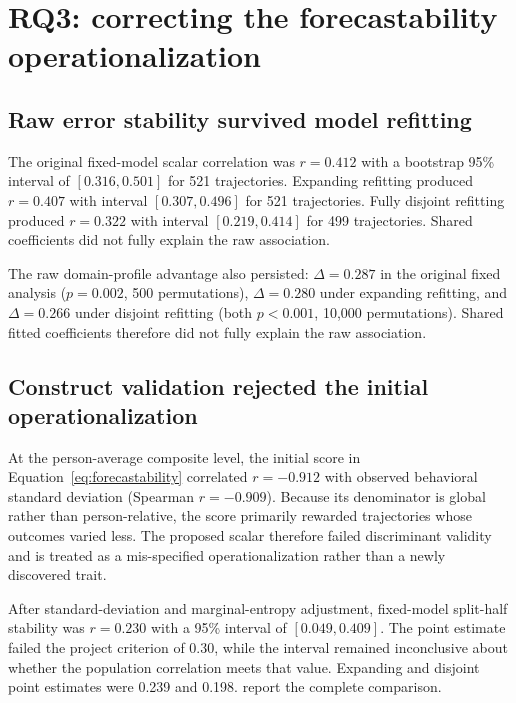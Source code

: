 \documentclass[a4paper,11pt,oneside]{report}
\begin{document}
\section{RQ3: correcting the forecastability operationalization}

\subsection{Raw error stability survived model refitting}

The original fixed-model scalar correlation was $r=0.412$ with a bootstrap 95\%
interval of $[0.316,0.501]$ for 521 trajectories. Expanding refitting produced
$r=0.407$ with interval $[0.307,0.496]$ for 521 trajectories. Fully disjoint
refitting produced $r=0.322$ with interval $[0.219,0.414]$ for 499 trajectories.
Shared coefficients did not fully explain the raw association.

The raw domain-profile advantage also persisted: $\Delta=0.287$ in the original
fixed analysis ($p=0.002$, 500 permutations), $\Delta=0.280$ under expanding
refitting, and $\Delta=0.266$ under disjoint refitting (both $p<0.001$, 10,000
permutations). Shared fitted coefficients therefore did not fully explain the raw
association.

\subsection{Construct validation rejected the initial operationalization}

At the person-average composite level, the initial score in
Equation~\ref{eq:forecastability} correlated $r=-0.912$ with observed behavioral
standard deviation (Spearman $r=-0.909$). Because its denominator is global rather
than person-relative, the score primarily rewarded trajectories whose outcomes
varied less. The proposed scalar therefore failed discriminant validity and is
treated as a mis-specified operationalization rather than a newly discovered trait.

After standard-deviation and marginal-entropy adjustment, fixed-model split-half
stability was $r=0.230$ with a 95\% interval of $[0.049,0.409]$. The point estimate
failed the project criterion of 0.30, while the interval remained inconclusive about
whether the population correlation meets that value. Expanding and disjoint point
estimates were 0.239 and 0.198. 
report the complete comparison.
\end{document}
